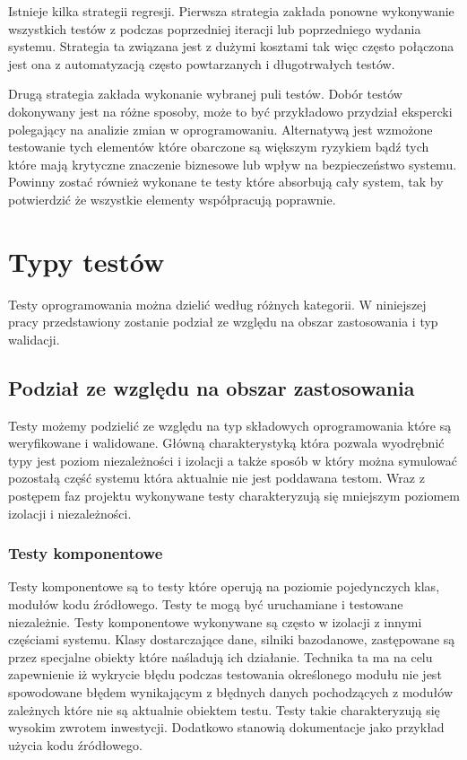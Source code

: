 Istnieje kilka strategii regresji. Pierwsza strategia zakłada ponowne wykonywanie wszystkich testów z podczas poprzedniej iteracji lub poprzedniego wydania systemu. Strategia ta związana jest z dużymi kosztami tak więc często połączona jest ona z automatyzacją często powtarzanych i długotrwałych testów. 

Drugą strategia zakłada wykonanie wybranej puli testów. Dobór testów dokonywany jest na różne sposoby, może to być przykładowo przydział ekspercki polegający na analizie zmian w oprogramowaniu. Alternatywą jest wzmożone testowanie tych elementów które obarczone są większym ryzykiem bądź tych które mają krytyczne znaczenie biznesowe lub wpływ na bezpieczeństwo systemu. Powinny zostać również wykonane te testy które absorbują cały system, tak by potwierdzić że wszystkie elementy współpracują poprawnie.

\section{Typy testów}
Testy oprogramowania można dzielić według różnych kategorii. W niniejszej pracy przedstawiony zostanie podział ze względu na obszar zastosowania i typ walidacji.
 
\subsection{Podział ze względu na obszar zastosowania}
Testy możemy podzielić ze względu na typ składowych oprogramowania które są weryfikowane i walidowane. Główną charakterystyką która pozwala wyodrębnić typy jest poziom niezależności i izolacji a także sposób w który można symulować pozostałą część systemu która aktualnie nie jest poddawana testom. Wraz z postępem faz projektu wykonywane testy charakteryzują się mniejszym poziomem izolacji i niezależności. 


\subsubsection{Testy komponentowe}
Testy komponentowe są to testy które operują na poziomie pojedynczych klas, modułów kodu źródłowego. Testy te mogą być uruchamiane i testowane niezależnie. Testy komponentowe wykonywane są często w izolacji z innymi częściami systemu. Klasy dostarczające dane, silniki bazodanowe, zastępowane są przez specjalne obiekty które naśladują ich działanie. Technika ta ma na celu zapewnienie iż wykrycie błędu podczas testowania określonego modułu nie jest spowodowane błędem wynikającym z błędnych danych pochodzących z modułów zależnych które nie są aktualnie obiektem testu. Testy takie charakteryzują się wysokim zwrotem inwestycji. Dodatkowo stanowią dokumentacje jako przykład użycia kodu źródłowego.

